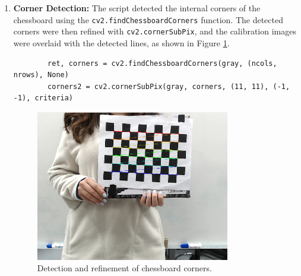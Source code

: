 \begin{enumerate}
        \item \textbf{Corner Detection:} 
        The script detected the internal corners of the chessboard using the \texttt{cv2.findChessboardCorners} function. The detected corners were then refined with \texttt{cv2.cornerSubPix}, and the calibration images were overlaid with the detected lines, as shown in Figure \ref{fig:det_ejemplos}.
        \begin{verbatim}
        ret, corners = cv2.findChessboardCorners(gray, (ncols, nrows), None)
        corners2 = cv2.cornerSubPix(gray, corners, (11, 11), (-1, -1), criteria)
        \end{verbatim}
        \begin{center}
            \begin{figure}[H]
                \centering
                \includegraphics[width=0.8\textwidth]{pictures/calib_predictions.png}
                \caption{Detection and refinement of chessboard corners.}
                \label{fig:det_ejemplos}
            \end{figure}
        \end{center}
    

\end{enumerate}
